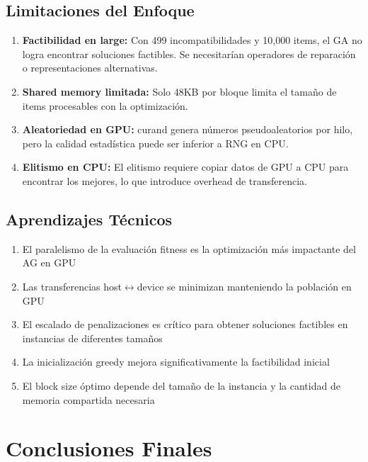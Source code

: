\documentclass[12pt,a4paper]{article}
\begin{document}
\subsection{Limitaciones del Enfoque}

\begin{enumerate}
  \item \textbf{Factibilidad en large:} Con 499 incompatibilidades y 10,000 items, el GA no logra encontrar soluciones factibles. Se necesitar\'ian operadores de reparaci\'on o representaciones alternativas.
  \item \textbf{Shared memory limitada:} Solo 48KB por bloque limita el tama\~no de items procesables con la optimizaci\'on.
  \item \textbf{Aleatoriedad en GPU:} curand genera n\'umeros pseudoaleatorios por hilo, pero la calidad estad\'istica puede ser inferior a RNG en CPU.
  \item \textbf{Elitismo en CPU:} El elitismo requiere copiar datos de GPU a CPU para encontrar los mejores, lo que introduce overhead de transferencia.
\end{enumerate}

\subsection{Aprendizajes T\'ecnicos}

\begin{enumerate}
  \item El paralelismo de la evaluaci\'on fitness es la optimizaci\'on m\'as impactante del AG en GPU
  \item Las transferencias host$\leftrightarrow$device se minimizan manteniendo la poblaci\'on en GPU
  \item El escalado de penalizaciones es cr\'itico para obtener soluciones factibles en instancias de diferentes tama\~nos
  \item La inicializaci\'on greedy mejora significativamente la factibilidad inicial
  \item El block size \'optimo depende del tama\~no de la instancia y la cantidad de memoria compartida necesaria
\end{enumerate}

\section*{Conclusiones Finales}
\end{document}
